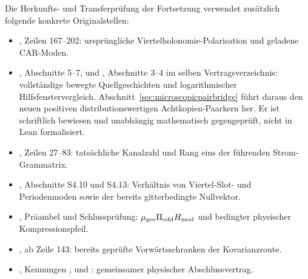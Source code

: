 Die Herkunfts- und Transferprüfung der Fortsetzung verwendet zusätzlich folgende konkrete Originalstellen:
\begin{itemize}
\item {}, Zeilen 167--202: ursprüngliche Viertelholonomie-Polarisation und geladene CAR-Moden.
\item {}, Abschnitte 5--7, und , Abschnitte 3--4 im selben Vertragsverzeichnis: vollständige bewegte Quellgeschichten und logarithmischer Hilfsfenstervergleich. Abschnitt~\ref{sec:microscopicpairbridge} führt daraus den neuen positiven distributionswertigen Achtkopien-Paarkern her. Er ist schriftlich bewiesen und unabhängig mathematisch gegengeprüft, nicht in Lean formalisiert.
\item {}, Zeilen 27--83: tatsächliche Kanalzahl und Rang eins der führenden Strom-Grammatrix.
\item {}, Abschnitte S4.10 und S4.13: Verhältnis von Viertel-Slot- und Periodenmoden sowie der bereits gitterbedingte Nullvektor.
\item {}, Präambel und Schlussprüfung: $\mu_{\rm geo}\Pi_{\rm odd}H_{\rm mod}$ und bedingter physischer Kompressionspfeil.
\item {}, ab Zeile 143: bereits geprüfte Vorwärtsschranken der Kovarianzroute.
\item {}, Kennungen ,  und : gemeinsamer physischer Abschlussvertrag.
\end{itemize}

